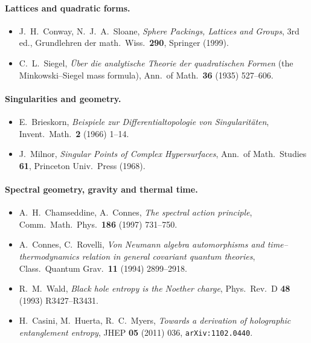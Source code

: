 \paragraph{Lattices and quadratic forms.}
\begin{itemize}\setlength\itemsep{1.5pt}
\item J.~H.~Conway, N.~J.~A.~Sloane, \textit{Sphere Packings, Lattices and Groups}, 3rd ed.,
  Grundlehren der math.\ Wiss.\ \textbf{290}, Springer (1999).
\item C.~L.~Siegel, \textit{\"Uber die analytische Theorie der quadratischen Formen}
  (the Minkowski--Siegel mass formula), Ann.\ of Math.\ \textbf{36} (1935) 527--606.
\end{itemize}

\paragraph{Singularities and geometry.}
\begin{itemize}\setlength\itemsep{1.5pt}
\item E.~Brieskorn, \textit{Beispiele zur Differentialtopologie von Singularit\"aten},
  Invent.\ Math.\ \textbf{2} (1966) 1--14.
\item J.~Milnor, \textit{Singular Points of Complex Hypersurfaces}, Ann.\ of Math.\ Studies
  \textbf{61}, Princeton Univ.\ Press (1968).
\end{itemize}

\paragraph{Spectral geometry, gravity and thermal time.}
\begin{itemize}\setlength\itemsep{1.5pt}
\item A.~H.~Chamseddine, A.~Connes, \textit{The spectral action principle}, Comm.\ Math.\
  Phys.\ \textbf{186} (1997) 731--750.
\item A.~Connes, C.~Rovelli, \textit{Von Neumann algebra automorphisms and
  time--thermodynamics relation in general covariant quantum theories}, Class.\ Quantum
  Grav.\ \textbf{11} (1994) 2899--2918.
\item R.~M.~Wald, \textit{Black hole entropy is the Noether charge}, Phys.\ Rev.\ D
  \textbf{48} (1993) R3427--R3431.
\item H.~Casini, M.~Huerta, R.~C.~Myers, \textit{Towards a derivation of holographic
  entanglement entropy}, JHEP \textbf{05} (2011) 036, \texttt{arXiv:1102.0440}.
\end{itemize}
\normalsize
